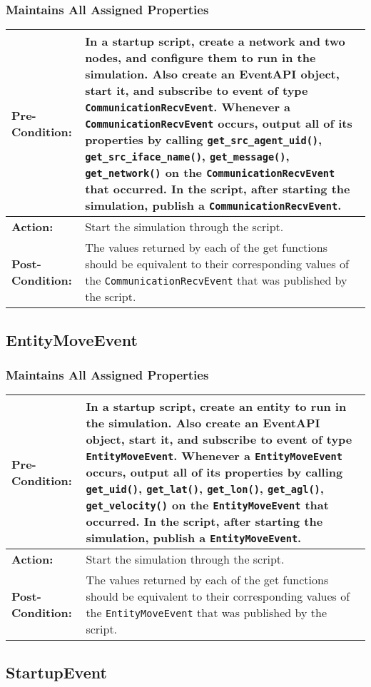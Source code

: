 \documentclass[titlepage]{article}
\newcommand{\testcase}[3]{
    \begin{center}
    \begin{tabular}{| l | p{0.7\textwidth}|}
        \hline
        \rowcolor[gray]{0.8}\textbf{Pre-Condition:} & #1 \\ \hline
        \textbf{Action:} & #2 \\ \hline
        \rowcolor[gray]{0.8}\textbf{Post-Condition:} & #3 \\ \hline
    \end{tabular}
    \end{center}
}
\begin{document}
\subsubsection{Maintains All Assigned Properties}
\testcase{In a startup script, create a network and two nodes, and configure them to run in the simulation. Also create an EventAPI object, start it, and subscribe to event of type \texttt{CommunicationRecvEvent}. Whenever a \texttt{CommunicationRecvEvent} occurs, output all of its properties by calling \texttt{get\_src\_agent\_uid()}, \texttt{get\_src\_iface\_name()}, \texttt{get\_message()}, \texttt{get\_network()} on the \texttt{CommunicationRecvEvent} that occurred. In the script, after starting the simulation, publish a \texttt{CommunicationRecvEvent}.}{Start the simulation through the script.}{The values returned by each of the get functions should be equivalent to their corresponding values of the \texttt{CommunicationRecvEvent} that was published by the script.}

\subsection{EntityMoveEvent}
\subsubsection{Maintains All Assigned Properties}
\testcase{In a startup script, create an entity to run in the simulation. Also create an EventAPI object, start it, and subscribe to event of type \texttt{EntityMoveEvent}. Whenever a \texttt{EntityMoveEvent} occurs, output all of its properties by calling \texttt{get\_uid()}, \texttt{get\_lat()}, \texttt{get\_lon()}, \texttt{get\_agl()}, \texttt{get\_velocity()} on the \texttt{EntityMoveEvent} that occurred. In the script, after starting the simulation, publish a \texttt{EntityMoveEvent}.}{Start the simulation through the script.}{The values returned by each of the get functions should be equivalent to their corresponding values of the \texttt{EntityMoveEvent} that was published by the script.}

\subsection{StartupEvent}
\end{document}
